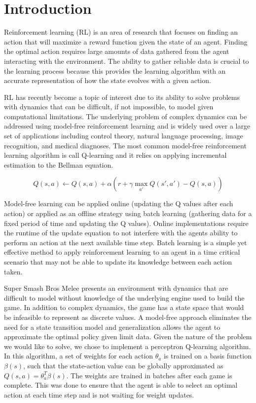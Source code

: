 
\section{Introduction}

Reinforcement learning (RL) is an area of research that focuses on finding an action that will maximize a reward function given the state of an agent. Finding the optimal action requires large amounts of data gathered from the agent interacting with the environment. The ability to gather reliable data is crucial to the learning process because this provides the learning algorithm with an accurate representation of how the state evolves with a given action. 

RL has recently become a topic of interest due to its ability to solve problems with dynamics that can be difficult, if not impossible, to model given computational limitations. The underlying problem of complex dynamics can be addressed using model-free reinforcement learning and is widely used over a large set of applications including control theory, natural language processing, image recognition, and medical diagnoses. The most common model-free reinforcement learning algorithm is call Q-learning and it relies on applying incremental estimation to the Bellman equation.

\begin{equation}
	Q(s,a) \leftarrow Q(s,a)+\alpha(r + \gamma \max_{a'} Q(s',a') - Q(s,a))
\end{equation}

Model-free learning can be applied online (updating the Q values after each action) or applied as an offline strategy using batch learning (gathering data for a fixed period of time and updating the Q values). Online implementations require the runtime of the update equation to not interfere with the agents ability to perform an action at the next available time step. Batch learning is a simple yet effective method to apply reinforcement learning to an agent in a time critical scenario that may not be able to update its knowledge between each action taken.

Super Smash Bros Melee presents an environment with dynamics that are difficult to model without knowledge of the underlying engine used to build the game. In addition to complex dynamics, the game has a state space that would be infeasible to represent as discrete values. A model-free approach eliminates the need for a state transition model and generalization allows the agent to approximate the optimal policy given limit data. Given the nature of the problem we would like to solve, we chose to implement a perceptron Q-learning algorithm. In this algorithm, a set of weights for each action $\theta_a$ is trained on a basis function $\beta(s)$, such that the state-action value can be globally approximated as $Q(s,a) = \theta^T_a\beta(s)$. The weights are trained in batches after each game is complete. This was done to ensure that the agent is able to select an optimal action at each time step and is not waiting for weight updates.

